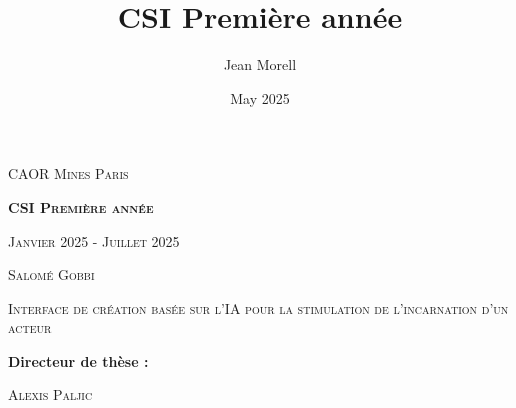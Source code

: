 \documentclass[12pt,a4paper]{article}
\title{CSI Première année}
\author{Jean Morell}
\date{May 2025}
\begin{document}
\begin{titlepage}
    \begin{center}
        \vspace*{1cm}
        
        \large{\textsc{CAOR Mines Paris}}
        
        \vspace{0.5cm}
        \textbf{\Huge{\textsc{CSI Première année}}}
        
        \vspace{0.5cm}
        \textsc{Janvier 2025 - Juillet 2025}
        
        \vspace{1cm}
        
        \Large{\textsc{Salomé Gobbi}}

        \vspace{0.5cm}
        \large{\textsc{Interface de création basée sur l'IA pour la stimulation de l'incarnation d'un acteur}}
        
        
        
        \vspace{0.8cm}
        
        \begin{multicols}{2}
        \raggedleft
        \textbf{\large{Directeur de thèse :}}\\
        \raggedright
        \textsc{Alexis Paljic}\\
        \end{multicols}
        
    \end{center}
\end{titlepage}

\renewcommand{\contentsname}{Sommaire}
\tableofcontents
\newpage

\pagestyle{fancy}
\renewcommand\headrulewidth{1pt}
\fancyhead[R]{}
\end{document}
